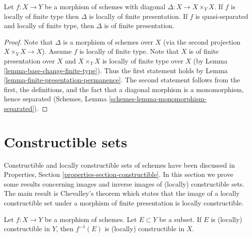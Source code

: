 \begin{lemma}
\label{lemma-diagonal-morphism-finite-type}
Let $f : X \to Y$ be a morphism of schemes with diagonal
$\Delta : X \to X \times_Y X$. If $f$ is locally of finite type
then $\Delta$ is locally of finite presentation. If $f$ is quasi-separated
and locally of finite type, then $\Delta$ is of finite presentation.
\end{lemma}

\begin{proof}
Note that $\Delta$ is a morphism of schemes over $X$ (via the second
projection $X \times_Y X \to X$). Assume $f$ is locally of finite type.
Note that $X$ is of finite presentation over $X$ and $X \times_Y X$ is
locally of finite type over $X$ (by Lemma \ref{lemma-base-change-finite-type}).
Thus the first statement holds by
Lemma \ref{lemma-finite-presentation-permanence}.
The second statement follows from the first, the definitions, and
the fact that a diagonal morphism is a monomorphism, hence separated
(Schemes, Lemma \ref{schemes-lemma-monomorphism-separated}).
\end{proof}








\section{Constructible sets}
\label{section-constructible}

\noindent
Constructible and locally constructible sets of schemes have been discussed in
Properties, Section \ref{properties-section-constructible}.
In this section we prove some results concerning images and inverse images
of (locally) constructible sets. The main result is Chevalley's theorem
which states that the image of a locally constructible set under a morphism
of finite presentation is locally constructible.

\begin{lemma}
\label{lemma-inverse-image-constructible}
Let $f : X \to Y$ be a morphism of schemes.
Let $E \subset Y$ be a subset.
If $E$ is (locally) constructible in $Y$, then $f^{-1}(E)$ is (locally)
constructible in $X$.
\end{lemma}

